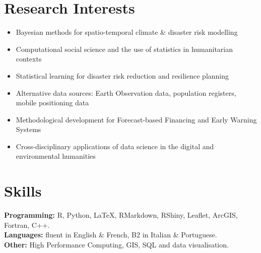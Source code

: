 \documentclass[a4paper,10pt]{article}
\begin{document}
\section*{Research Interests}

\begin{itemize}[noitemsep]
  \item Bayesian methods for spatio-temporal climate \& disaster risk modelling
  \item Computational social science and the use of statistics in humanitarian contexts
  \item Statistical learning for disaster risk reduction and resilience planning
  \item Alternative data sources: Earth Observation data, population registers, mobile positioning data
  \item Methodological development for Forecast-based Financing and Early Warning Systems
  \item Cross-disciplinary applications of data science in the digital and environmental humanities
\end{itemize}

\section*{Skills}
\textbf{Programming:} R, Python, LaTeX, RMarkdown, RShiny, Leaflet, ArcGIS, Fortran, C++. \\
\textbf{Languages:} fluent in English \& French, B2 in Italian \& Portuguese. \\
\textbf{Other:} High Performance Computing, GIS, SQL and data visualisation.

\end{document}
